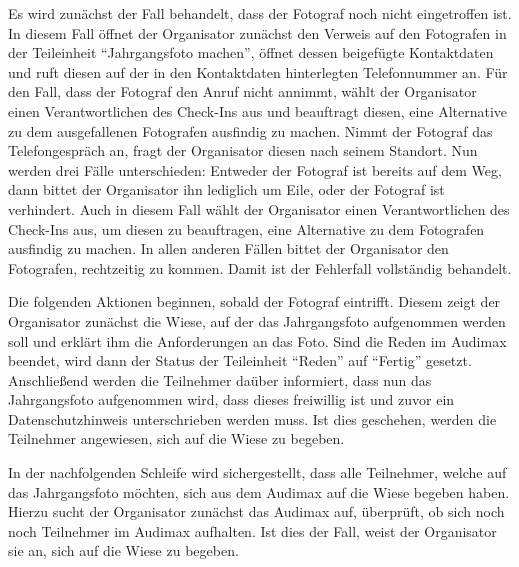 Es wird zunächst der Fall behandelt, dass der Fotograf noch nicht eingetroffen ist. In diesem Fall öffnet der Organisator zunächst den Verweis auf den Fotografen in der Teileinheit \enquote{Jahrgangsfoto machen}, öffnet dessen beigefügte Kontaktdaten und ruft diesen auf der in den Kontaktdaten hinterlegten Telefonnummer an. Für den Fall, dass der Fotograf den Anruf nicht annimmt, wählt der Organisator einen Verantwortlichen des Check-Ins aus und beauftragt diesen, eine Alternative zu dem ausgefallenen Fotografen ausfindig zu machen. Nimmt der Fotograf das Telefongespräch an, fragt der Organisator diesen nach seinem Standort. Nun werden drei Fälle unterschieden: Entweder der Fotograf ist bereits auf dem Weg, dann bittet der Organisator ihn lediglich um Eile, oder der Fotograf ist verhindert. Auch in diesem Fall wählt der Organisator einen Verantwortlichen des Check-Ins aus, um diesen zu beauftragen, eine Alternative zu dem Fotografen ausfindig zu machen. In allen anderen Fällen bittet der Organisator den Fotografen, rechtzeitig zu kommen. Damit ist der Fehlerfall vollständig behandelt.

Die folgenden Aktionen beginnen, sobald der Fotograf eintrifft. Diesem zeigt der Organisator zunächst die Wiese, auf der das Jahrgangsfoto aufgenommen werden soll und erklärt ihm die Anforderungen an das Foto. Sind die Reden im Audimax beendet, wird dann der Status der Teileinheit \enquote{Reden} auf \enquote{Fertig} gesetzt. Anschließend werden die Teilnehmer daüber informiert, dass nun das Jahrgangsfoto aufgenommen wird, dass dieses freiwillig ist und zuvor ein Datenschutzhinweis unterschrieben werden muss. Ist dies geschehen, werden die Teilnehmer angewiesen, sich auf die Wiese zu begeben. 

In der nachfolgenden Schleife wird sichergestellt, dass alle Teilnehmer, welche auf das Jahrgangsfoto möchten, sich aus dem Audimax auf die Wiese begeben haben. Hierzu sucht der Organisator zunächst das Audimax auf, überprüft, ob sich noch noch Teilnehmer im Audimax aufhalten. Ist dies der Fall, weist der Organisator sie an, sich auf die Wiese zu begeben.

